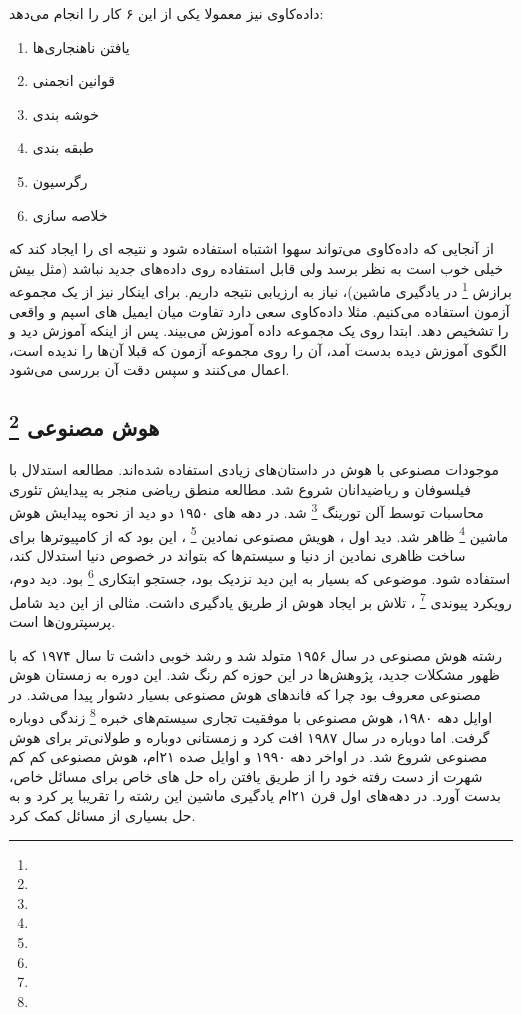 \documentclass[a4paper, 12pt]{article}
\begin{document}
 داده‌کاوی نیز معمولا یکی از این ۶ کار را انجام می‌دهد:
 \begin{enumerate}
 	\item
 	یافتن ناهنجاری‌ها 
 	\item
 	قوانین انجمنی
 	\item
 	خوشه بندی
 	\item
 	طبقه بندی
 	\item
 	رگرسیون
 	\item
 	خلاصه سازی
 \end{enumerate}
 
 از آنجایی که داده‌کاوی می‌تواند سهوا اشتباه استفاده شود و نتیجه ای را ایجاد کند که خیلی خوب است به نظر برسد ولی قابل استفاده روی داده‌های جدید نباشد (مثل بیش برازش
 \footnote{}
  در یادگیری ماشین)، نیاز به ارزیابی نتیجه داریم. برای اینکار نیز از یک مجموعه آزمون استفاده می‌کنیم. مثلا داده‌کاوی سعی دارد تفاوت میان ایمیل های اسپم و واقعی را تشخیص دهد. ابتدا روی یک مجموعه داده آموزش می‌بیند. پس از اینکه آموزش دید و الگوی آموزش دیده بدست آمد، آن را روی مجموعه آزمون که قبلا آن‌ها را ندیده است، اعمال می‌کنند و سپس دقت آن بررسی می‌شود. 
  
   \subsection*{هوش مصنوعی
   \footnote{}
	}
 موجودات مصنوعی با هوش در داستان‌های زیادی استفاده شده‌اند. مطالعه استدلال با  فیلسوفان و ریاضیدانان شروع شد.  مطالعه منطق ریاضی منجر به پیدایش تئوری محاسبات توسط آلن تورینگ 
 \footnote{}
 شد. در دهه های ۱۹۵۰ دو دید از نحوه پیدایش هوش ماشین 
 \footnote{}
 ظاهر شد. دید اول ، هویش مصنوعی نمادین 
 \footnote{}
 ، این بود که از کامپیوترها برای ساخت  
 ظاهری نمادین از دنیا و سیستم‌ها که بتواند در خصوص دنیا استدلال کند،
 استفاده شود. موضوعی که بسیار به این دید نزدیک بود، جستجو ابتکاری 
 \footnote{}
 بود. دید دوم، رویکرد پیوندی 
 \footnote{}
، تلاش بر ایجاد هوش از طریق یادگیری داشت. مثالی از این دید شامل پرسپترون‌ها است. 

رشته هوش مصنوعی در سال ۱۹۵۶ متولد شد و رشد خوبی داشت تا سال ۱۹۷۴ که با ظهور مشکلات جدید، پژوهش‌ها در این حوزه کم رنگ شد. این دوره به زمستان هوش مصنوعی معروف بود چرا که فاند‌های هوش مصنوعی بسیار دشوار پیدا می‌شد. در اوایل دهه ۱۹۸۰، هوش مصنوعی با موفقیت تجاری سیستم‌های خبره
\footnote{}
زندگی دوباره گرفت.  اما دوباره در سال ۱۹۸۷ افت کرد و زمستانی دوباره و طولانی‌تر برای هوش مصنوعی شروع شد. در اواخر دهه ۱۹۹۰ و اوایل صده ۲۱ام، هوش مصنوعی کم کم شهرت از دست رفته خود را   از طریق یافتن راه حل های خاص برای مسائل خاص، بدست آورد.
در دهه‌های اول قرن ۲۱ام یادگیری ماشین این رشته را تقریبا پر کرد و به حل بسیاری از مسائل کمک کرد.
 
\end{document}
